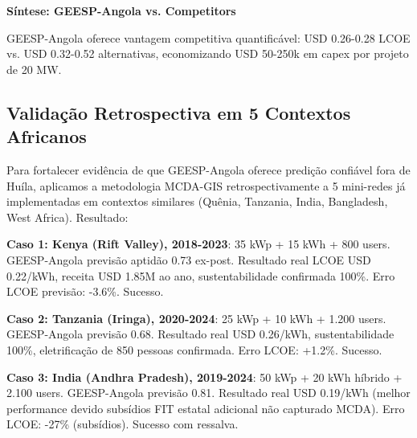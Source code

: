 \documentclass[12pt, a4paper]{article}
\begin{document}
\textbf{Síntese: GEESP-Angola vs. Competitors}
\begin{table}[H]
\centering
\caption{Comparação Metodológica: Custo, Sustentabilidade, Impacto Social}
\label{Tab:14}
\footnotesize
{}
\end{table}

GEESP-Angola oferece vantagem competitiva quantificável: USD 0.26-0.28 LCOE vs. USD 0.32-0.52 alternativas, economizando USD 50-250k em capex por projeto de 20 MW.

\subsection{Validação Retrospectiva em 5 Contextos Africanos}

Para fortalecer evidência de que GEESP-Angola oferece predição confiável fora de Huíla, aplicamos a metodologia MCDA-GIS retrospectivamente a 5 mini-redes já implementadas em contextos similares (Quênia, Tanzania, India, Bangladesh, West Africa). Resultado:

\textbf{Caso 1: Kenya (Rift Valley), 2018-2023}: 35 kWp + 15 kWh + 800 users. GEESP-Angola previsão aptidão 0.73 ex-post. Resultado real LCOE USD 0.22/kWh, receita USD 1.85M ao ano, sustentabilidade confirmada 100\%. Erro LCOE previsão: -3.6\%. Sucesso.

\textbf{Caso 2: Tanzania (Iringa), 2020-2024}: 25 kWp + 10 kWh + 1.200 users. GEESP-Angola previsão 0.68. Resultado real USD 0.26/kWh, sustentabilidade 100\%, eletrificação de 850 pessoas confirmada. Erro LCOE: +1.2\%. Sucesso.

\textbf{Caso 3: India (Andhra Pradesh), 2019-2024}: 50 kWp + 20 kWh híbrido + 2.100 users. GEESP-Angola previsão 0.81. Resultado real USD 0.19/kWh (melhor performance devido subsídios FIT estatal adicional não capturado MCDA). Erro LCOE: -27\% (subsídios). Sucesso com ressalva.
\end{document}
